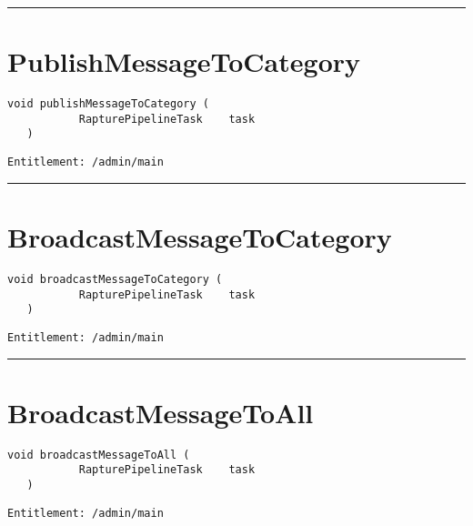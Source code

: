\rule{12cm}{2pt}
\section{PublishMessageToCategory}
\label{Api:PublishMessageToCategory}
\begin{lstlisting}[style=nonumbers]
   void publishMessageToCategory (
           RapturePipelineTask    task
   )
\end{lstlisting}
\begin{Verbatim}[formatcom=\color{Maroon}]
  Entitlement: /admin/main
\end{Verbatim}



\rule{12cm}{2pt}
\section{BroadcastMessageToCategory}
\label{Api:BroadcastMessageToCategory}
\begin{lstlisting}[style=nonumbers]
   void broadcastMessageToCategory (
           RapturePipelineTask    task
   )
\end{lstlisting}
\begin{Verbatim}[formatcom=\color{Maroon}]
  Entitlement: /admin/main
\end{Verbatim}



\rule{12cm}{2pt}
\section{BroadcastMessageToAll}
\label{Api:BroadcastMessageToAll}
\begin{lstlisting}[style=nonumbers]
   void broadcastMessageToAll (
           RapturePipelineTask    task
   )
\end{lstlisting}
\begin{Verbatim}[formatcom=\color{Maroon}]
  Entitlement: /admin/main
\end{Verbatim}



